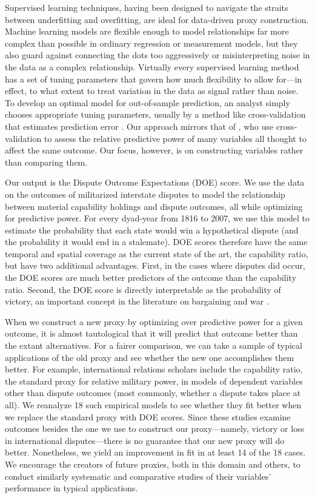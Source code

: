 Supervised learning techniques, having been designed to navigate the straits between underfitting and overfitting, are ideal for data-driven proxy construction.
Machine learning models are flexible enough to model relationships far more complex than possible in ordinary regression or measurement models, but they also guard against connecting the dots too aggressively or misinterpreting noise in the data as a complex relationship.
Virtually every supervised learning method has a set of tuning parameters that govern how much flexibility to allow for---in effect, to what extent to treat variation in the data as signal rather than noise.
To develop an optimal model for out-of-sample prediction, an analyst simply chooses appropriate tuning parameters, usually by a method like cross-validation that estimates prediction error \citep{Efron:2012es}.
Our approach mirrors that of \citet{Hill:2014ki}, who use cross-validation to assess the relative predictive power of many variables all thought to affect the same outcome.
Our focus, however, is on constructing variables rather than comparing them.

Our output is the Dispute Outcome Expectations (DOE) score.
We use the data on the outcomes of militarized interstate disputes \citep{Palmer:2015hp} to model the relationship between material capability holdings and dispute outcomes, all while optimizing for predictive power.
For every dyad-year from 1816 to 2007, we use this model to estimate the probability that each state would win a hypothetical dispute (and the probability it would end in a stalemate).
DOE scores therefore have the same temporal and spatial coverage as the current state of the art, the capability ratio, but have two additional advantages.
First, in the cases where disputes did occur, the DOE scores are much better predictors of the outcome than the capability ratio.
Second, the DOE score is directly interpretable as the probability of victory, an important concept in the literature on bargaining and war \citep{fearon1995,powell1996stability}.

When we construct a new proxy by optimizing over predictive power for a given outcome, it is almost tautological that it will predict that outcome better than the extant alternatives.
For a fairer comparison, we can take a sample of typical applications of the old proxy and see whether the new one accomplishes them better.
For example, international relations scholars include the capability ratio, the standard proxy for relative military power, in models of dependent variables other than dispute outcomes (most commonly, whether a dispute takes place at all).
We reanalyze 18 such empirical models to see whether they fit better when we replace the standard proxy with DOE scores.
Since these studies examine outcomes besides the one we use to construct our proxy---namely, victory or loss in international disputes---there is no guarantee that our new proxy will do better.
Nonetheless, we yield an improvement in fit in at least 14 of the 18 cases.
We encourage the creators of future proxies, both in this domain and others, to conduct similarly systematic and comparative studies of their variables' performance in typical applications.

